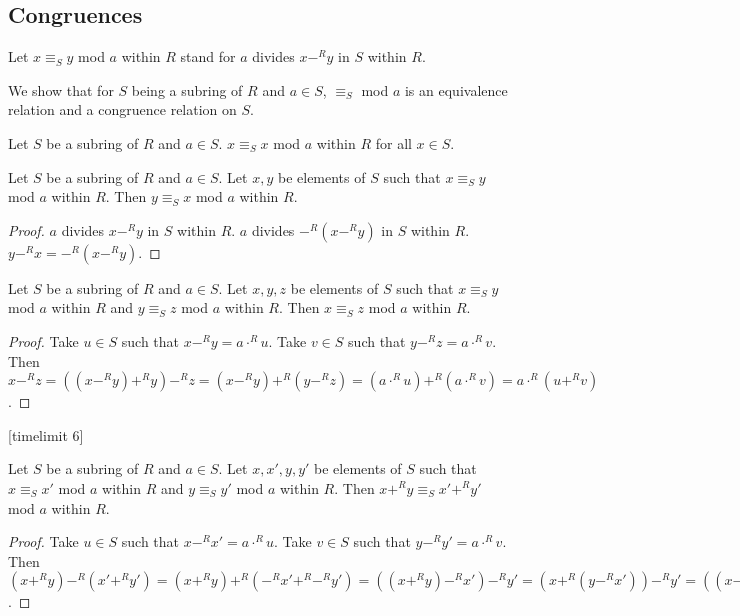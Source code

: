 \documentclass[english,11pt]{article}
\begin{document}
\subsection{Congruences}
\begin{forthel}
Let $x \equiv_{S} y$ mod $a$ within $R$ stand for $a$ divides $x-^{R} y$ in $S$ within $R$.

\end{forthel}
We show that for $S$ being a subring of $R$ and $a \in S$, $\equiv_{S}$ mod $a$ is an equivalence relation and
a congruence relation on $S$.

\begin{forthel}

\begin{lemma}
Let $S$ be a subring of $R$ and $a \in S$.
$x \equiv_{S} x$ mod $a$ within $R$ for all $x \in S$.
\end{lemma}

\begin{lemma}
Let $S$ be a subring of $R$ and $a \in S$.
Let $x,y$ be elements of $S$ such that
$x \equiv_{S} y$ mod $a$ within $R$. 
Then $y \equiv_{S} x$ mod $a$ within $R$.
\end{lemma}
\begin{proof}
$a$ divides  $x-^{R} y$ in $S$ within $R$.
$a$ divides  $-^{R}(x-^{R} y)$ in $S$ within $R$.
$y -^{R} x = -^{R}(x -^{R} y)$.
\end{proof}

\begin{lemma}
Let $S$ be a subring of $R$ and $a \in S$.
Let $x,y,z$ be elements of $S$ such that
$x \equiv_{S} y$ mod $a$ within $R$
and $y \equiv_{S} z$ mod $a$ within $R$. 
Then $x \equiv_{S} z$ mod $a$ within $R$.
\end{lemma}
\begin{proof}
Take $u \in S$ such that $x -^{R} y = a \cdot^{R} u$.
Take $v \in S$ such that $y -^{R} z = a \cdot^{R} v$.
Then
 $x -^{R} z =  
((x -^{R} y) +^{R} y) -^{R} z =
(x -^{R} y) +^{R} (y -^{R} z) =
(a \cdot^{R} u) +^{R} (a \cdot^{R} v) =
a \cdot^{R} (u +^{R} v)
$.
\end{proof}

[timelimit 6]
\begin{lemma}
Let $S$ be a subring of $R$ and $a \in S$.
Let $x,x',y,y'$ be elements of $S$ such that
$x \equiv_{S} x'$ mod $a$ within $R$
and $y \equiv_{S} y'$ mod $a$ within $R$. 
Then $x +^{R} y \equiv_{S} x' +^{R} y'$ mod $a$ within $R$.
\end{lemma}
\begin{proof}
Take $u \in S$ such that $x -^{R} x' = a \cdot^{R} u$.
Take $v \in S$ such that $y -^{R} y' = a \cdot^{R} v$.
Then
$(x +^{R} y) -^{R} (x' +^{R} y')  =  (x +^{R} y) +^{R} (-^{R} x' +^{R} -^{R} y')
= ((x +^{R} y) -^{R} x') -^{R} y' 
= (x +^{R} (y -^{R} x')) -^{R} y'
= ((x -^{R} x') +^{R} y) -^{R} y'
= (x -^{R} x') +^{R} (y -^{R} y')
= (a \cdot^{R} u) +^{R} (a \cdot^{R} v)$.


\end{proof}
\end{forthel}
\end{document}
